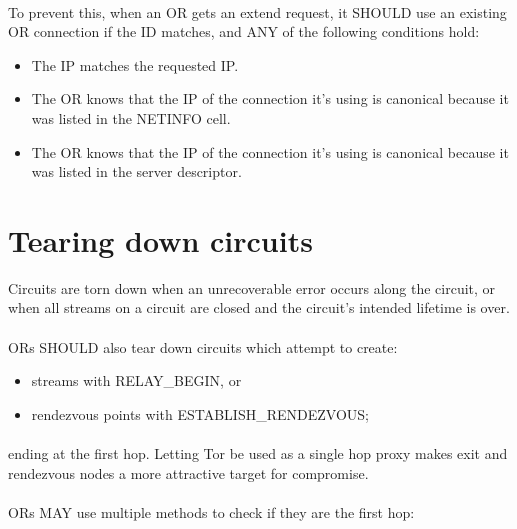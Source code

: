 \paragraph{}
To prevent this, when an OR gets an extend request, it SHOULD use an
existing OR connection if the ID matches, and ANY of the following
conditions hold:

\begin{itemize}
    \item The IP matches the requested IP.
    \item The OR knows that the IP of the connection it's using is canonical
    because it was listed in the NETINFO cell.
    \item The OR knows that the IP of the connection it's using is canonical
    because it was listed in the server descriptor.
\end{itemize}

\section{Tearing down circuits}
Circuits are torn down when an unrecoverable error occurs along
the circuit, or when all streams on a circuit are closed and the
circuit's intended lifetime is over.

\paragraph{}
ORs SHOULD also tear down circuits which attempt to create:

\begin{itemize}
    \item streams with RELAY\_BEGIN, or
    \item rendezvous points with ESTABLISH\_RENDEZVOUS;
\end{itemize}

\paragraph{}
ending at the first hop. Letting Tor be used as a single hop proxy makes
exit and rendezvous nodes a more attractive target for compromise.

\paragraph{}
ORs MAY use multiple methods to check if they are the first hop:

